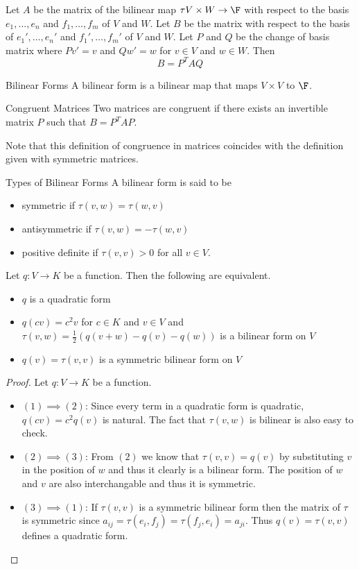 \begin{prp}{}{} Let $A$ be the matrix of the bilinear map $\tau V\times W\to\F$ with respect to the basis $e_1,\dots,e_n$ and $f_1,\dots,f_m$ of $V$ and $W$. Let $B$ be the matrix with respect to the basis of $e_1',\dots,e_n'$ and $f_1',\dots,f_m'$ of $V$ and $W$. Let $P$ and $Q$ be the change of basis matrix where $Pv'=v$ and $Qw'=w$ for $v\in V$ and $w\in W$. Then $$B=P^TAQ$$
\end{prp}

\begin{defn}{Bilinear Forms}{} A bilinear form is a bilinear map that maps $V\times V$ to $\F$. 
\end{defn}

\begin{defn}{Congruent Matrices}{} Two matrices are congruent if there exists an invertible matrix $P$ such that $B=P^TAP$. 
\end{defn}
Note that this definition of congruence in matrices coincides with the definition given with symmetric matrices. 

\begin{defn}{Types of Bilinear Forms}{} A bilinear form is said to be
\begin{itemize}
\item symmetric if $\tau(v,w)=\tau(w,v)$
\item antisymmetric if $\tau(v,w)=-\tau(w,v)$
\item positive definite if $\tau(v,v)>0$ for all $v\in V$. 
\end{itemize}
\end{defn}

\begin{prp}{}{} Let $q:V\to K$ be a function. Then the following are equivalent. 
\begin{itemize}
\item $q$ is a quadratic form
\item $q(cv)=c^2v$ for $c\in K$ and $v\in V$ and $\tau(v,w)=\frac{1}{2}(q(v+w)-q(v)-q(w))$ is a bilinear form on $V$
\item $q(v)=\tau(v,v)$ is a symmetric bilinear form on $V$
\end{itemize} \tcbline
\begin{proof}
Let $q:V\to K$ be a function. 
\begin{itemize}
\item $(1)\implies (2)$: Since every term in a quadratic form is quadratic, $q(cv)=c^2q(v)$ is natural. The fact that $\tau(v,w)$ is bilinear is also easy to check. 
\item $(2)\implies (3)$: From $(2)$ we know that $\tau(v,v)=q(v)$ by substituting $v$ in the position of $w$ and thus it clearly is a bilinear form. The position of $w$ and $v$ are also interchangable and thus it is symmetric. 
\item $(3)\implies (1)$: If $\tau(v,v)$ is a symmetric bilinear form then the matrix of $\tau$ is symmetric since $a_{ij}=\tau(e_i,f_j)=\tau(f_j,e_i)=a_{ji}$. Thus $q(v)=\tau(v,v)$ defines a quadratic form. 
\end{itemize}
\end{proof}
\end{prp}

